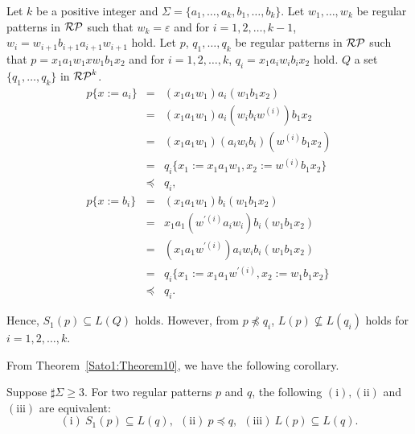 \begin{ex}\label{counter-example4Theorem10}
    Let $k$ be a positive integer and $\Sigma= \{a_{1},\ldots,a_{k},b_{1},\ldots,b_{k}\}$.
    Let $w_{1},\ldots,w_{k}$ be regular patterns in $\mathcal{RP}$ such that 
    $w_{k} = \varepsilon$ and for $i=1,2,\ldots,k-1$, $w_{i} = w_{i+1}b_{i+1}a_{i+1}w_{i+1}$ hold.
    Let $p$, $q_{1},\ldots,q_{k}$ be regular patterns in $\mathcal{RP}$ such that
    $p = x_{1}a_{1}w_{1}xw_{1}b_{1}x_{2}$ and  for $i=1,2,\ldots,k$, $q_{i} = x_{1}a_{i}w_{i}b_{i}x_{2}$ hold.
    $Q$ a set $\{q_{1},\ldots,q_{k}\}$ in $\mathcal{RP}^{k}$.
    \begin{eqnarray*}
        p \{ x:=a_{i} \} & = & (x_{1}a_{1}w_{1})a_{i}(w_{1}b_{1}x_{2})\\
        & = & (x_{1}a_{1}w_{1})a_{i}(w_{i}b_{i}w^{(i)})b_{1}x_{2}\\
        & = & (x_{1}a_{1}w_{1})(a_{i}w_{i}b_{i})(w^{(i)}b_{1}x_{2})\\
        & = & q_{i} \{ x_{1} := x_{1}a_{1}w_{1}, x_{2} := w^{(i)}b_{1}x_{2} \}\\
        & \preceq & q_{i},\\
        p \{ x:=b_{i} \} & = & (x_{1}a_{1}w_{1})b_{i}(w_{1}b_{1}x_{2})\\
        & = & x_{1}a_{1}(w^{\prime (i)}a_{i}w_{i})b_{i}(w_{1}b_{1}x_{2}) \\
        & = & (x_{1}a_{1}w^{\prime (i)})a_{i}w_{i}b_{i}(w_{1}b_{1}x_{2}) \\
        & = & q_{i} \{ x_{1} := x_{1}a_{1}w^{\prime (i)}, x_{2} := w_{1}b_{1}x_{2} \}\\
        & \preceq & q_{i}.
    \end{eqnarray*}

   Hence, $S_{1}(p) \subseteq L(Q)$ holds.
   However, from $p \not \preceq q_{i}$, $L(p) \not \subseteq L(q_{i})$ holds for $i=1,2,\ldots,k$.
\end{ex}

From Theorem~\ref{Sato1:Theorem10},
we have the following corollary.
\begin{col}
    Suppose $\sharp\Sigma \geq 3$.
    For two regular patterns $p$ and $q$,
    the following $(\mathrm{i}), (\mathrm{ii})$ and $(\mathrm{iii})$ are equivalent:
    \[
        (\mathrm{i})\ S_{1}(p) \subseteq L(q),\ \
        (\mathrm{ii})\ p \preceq q,\ \
        (\mathrm{iii})\ L(p) \subseteq L(q).
    \]
\end{col}